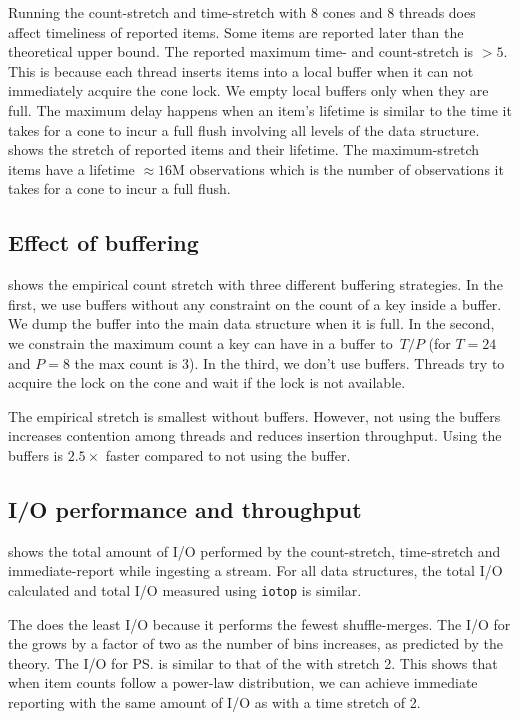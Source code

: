 Running the count-stretch and time-stretch \LERT with $8$ cones and $8$ threads
does affect timeliness of reported items. Some items are reported later than the
theoretical upper bound. The reported maximum time- and count-stretch is
$>5$.
%
This is because each thread inserts items into a local buffer when it can not
immediately acquire the cone lock.  We empty local buffers only when they are
full.
%
The maximum delay happens when an item's lifetime is similar to the time it
takes for a cone to incur a full flush involving all levels of the data
structure.~ shows the stretch of reported items and
their lifetime. The maximum-stretch items have a
lifetime $\approx16$M observations which is the number of observations it takes
for a cone to incur a full flush.

\subsection{Effect of buffering}
 shows the empirical count stretch with three
different buffering strategies. In the first, we use buffers without
any constraint on the count of a key inside a buffer. We dump the buffer into
the main data structure when it is full. In the second, we constrain the maximum
count a key can have in a buffer to~$T/P$ (for $T=24$ and $P=8$ the max count
is 3). In the third, we don't use buffers. Threads try to acquire the lock on
the cone and wait if the lock is not available.

The empirical stretch is smallest without  buffers.
However, not using the buffers increases contention among
threads and reduces insertion throughput. Using the buffers is
$2.5\times$ faster compared to not using the buffer.

\subsection{I/O performance and throughput}

 shows the total amount of I/O 
performed by the count-stretch, time-stretch and immediate-report \LERT while ingesting a stream. For all data
structures, the total I/O calculated and total I/O measured using \texttt{iotop}
is similar.

The \cs does the least I/O because it performs the fewest
shuffle-merges. The I/O for the \ts grows by a factor of two as 
the number of bins increases, as predicted by the theory. The I/O for \ps
is similar to that of the \ts with stretch 2.
This shows that
when item counts follow a power-law distribution, we can achieve immediate
reporting with the same amount of I/O as with a time stretch of 2.


